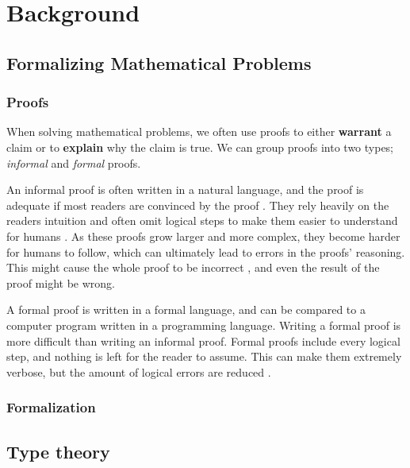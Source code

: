 \chapter{Background}

\section{Formalizing Mathematical Problems}

\subsection{Proofs}

When solving mathematical problems, we often use proofs
to either \textbf{warrant} a claim or to \textbf{explain} why the claim is true.
We can group proofs into two types; \textit{informal} and \textit{formal} proofs.


An informal proof is often written in a natural language, and the proof is adequate if most
readers are convinced by the proof \cite{bpierce}. They rely heavily on the readers intuition
and often omit logical steps to make them easier to understand for humans \cite{ams:formal-proof}.
As these proofs grow larger and more complex, they become harder for humans to follow,
which can ultimately lead to errors in the proofs' reasoning. This might cause the whole proof
to be incorrect \cite{rkhamsi}, and even the result of the proof might be wrong.

A formal proof is written in a formal language, and can be compared to a computer program
written in a programming language. Writing a formal proof is more difficult than writing an informal proof.
Formal proofs include every logical step, and nothing is left for the reader to assume.
This can make them extremely verbose, but the amount of logical errors are reduced \cite{ams:formal-proof}.

\subsection{Formalization}

\section{Type theory}

